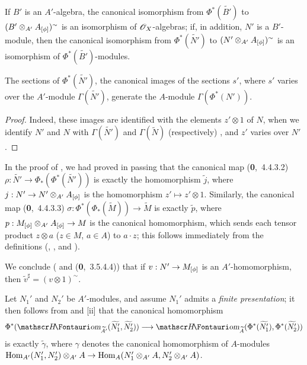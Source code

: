 If $B'$ is an $A'$-algebra, the canonical isomorphism from $\Phi^*(\widetilde{B'})$ to $(B'\otimes_{A'}A_{[\phi]})^\sim$ is an isomorphism of $\mathscr{O}_X$-algebras;
if, in addition, $N'$ is a $B'$-module, then the canonical isomorphism from $\Phi^*(\widetilde{N'})$ to $(N'\otimes_{A'}A_{[\phi]})^\sim$ is an isomorphism of $\Phi^*(\widetilde{B'})$-modules.

\begin{corollary}[1.6.6]
\label{1.1.6.6}
The sections of $\Phi^*(\widetilde{N'})$, the canonical images of the sections $s'$, where $s'$ varies over the $A'$-module $\Gamma(\widetilde{N'})$, generate the $A$-module $\Gamma(\Phi^*(N'))$.
\end{corollary}

\begin{proof}
\label{proof-1.1.6.6}
Indeed, these images are identified with the elements $z'\otimes 1$ of $N$, when we identify $N'$ and $N$ with $\Gamma(\widetilde{N'})$ and $\Gamma(\widetilde{N})$ (respectively) , and $z'$ varies over $N'$.
\end{proof}

\begin{env}[1.6.7]
\label{1.1.6.7}
In the proof of , we had proved in passing that the canonical map (\textbf{0},~4.4.3.2) $\rho:\widetilde{N'}\to\Phi_*(\Phi^*(\widetilde{N'}))$ is exactly the homomorphism $\widetilde{j}$,
where $j:N'\to N'\otimes_{A'}A_{[\vphi]}$ is the homomorphism $z'\mapsto z'\otimes 1$.
Similarly, the canonical map (\textbf{0},~4.4.3.3) $\sigma:\Phi^*(\Phi_*(\widetilde{M}))\to\widetilde{M}$ is exactly $\widetilde{p}$, where $p:M_{[\vphi]}\otimes_{A'}A_{[\vphi]}\to M$ is the canonical homomorphism, which sends each tensor product $z\otimes a$ ($z\in M$, $a\in A$) to $a\cdot z$;
this follows immediately from the definitions (, , and ).

We conclude ( and (\textbf{0},~3.5.4.4)) that if $v:N'\to M_{[\vphi]}$ is an $A'$-homomorphism, then $\widetilde{v}^\sharp=(v\otimes 1)^\sim$.
\end{env}

\begin{env}[1.6.8]
\label{1.1.6.8}
Let $N_1'$ and $N_2'$ be $A'$-modules, and assume $N_1'$ admits a \emph{finite presentation};
it then follows from  and [ii] that the
canonical homomorphism 
\[
  \Phi^*(\shHom_{\widetilde{A'}}(\widetilde{N_1'},\widetilde{N_2'}))
  \to\shHom_{\widetilde{A}}(\Phi^*(\widetilde{N_1'}),\Phi^*(\widetilde{N_2'}))
\]
is exactly $\widetilde{\gamma}$, where $\gamma$ denotes the canonical homomorphism of $A$-modules $\Hom_{A'}(N_1',N_2')\otimes_{A'}A\to\Hom_A(N_1'\otimes_{A'}A,N_2'\otimes_{A'}A)$.
\end{env}

